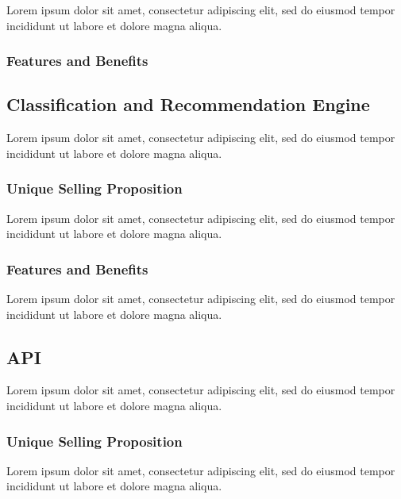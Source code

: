 Lorem ipsum dolor sit amet, consectetur adipiscing elit, sed do eiusmod tempor incididunt ut labore et dolore magna aliqua.

\subsubsection*{Features and Benefits}


\subsection{Classification and Recommendation Engine}

Lorem ipsum dolor sit amet, consectetur adipiscing elit, sed do eiusmod tempor incididunt ut labore et dolore magna aliqua.

\subsubsection*{Unique Selling Proposition}

Lorem ipsum dolor sit amet, consectetur adipiscing elit, sed do eiusmod tempor incididunt ut labore et dolore magna aliqua.

\subsubsection*{Features and Benefits}

Lorem ipsum dolor sit amet, consectetur adipiscing elit, sed do eiusmod tempor incididunt ut labore et dolore magna aliqua.


\subsection{API}

Lorem ipsum dolor sit amet, consectetur adipiscing elit, sed do eiusmod tempor incididunt ut labore et dolore magna aliqua.

\subsubsection*{Unique Selling Proposition}

Lorem ipsum dolor sit amet, consectetur adipiscing elit, sed do eiusmod tempor incididunt ut labore et dolore magna aliqua.

